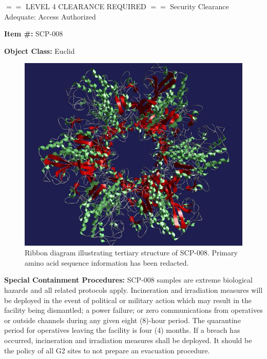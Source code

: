 \begin{center}
$==$ LEVEL 4 CLEARANCE REQUIRED $==$\linebreak
Security Clearance Adequate: Access Authorized
\end{center}

\textbf{Item \#:} SCP-008

\textbf{Object Class:} Euclid

\begin{figure}[h]
\begin{center}
\includegraphics[scale=0.33]{scp/008.jpg}
\linebreak Ribbon diagram illustrating tertiary structure of SCP-008. Primary amino acid sequence information has been redacted.
\end{center}
\end{figure}

\textbf{Special Containment Procedures:} SCP-008 samples are extreme biological hazards and all related protocols apply. Incineration and irradiation measures will be deployed in the event of political or military action which may result in the facility being dismantled; a power failure; or zero communications from operatives or outside channels during any given eight (8)-hour period. The quarantine period for operatives leaving the facility is four (4) months. If a breach has occurred, incineration and irradiation measures shall be deployed. It should be the policy of all G2 sites to not prepare an evacuation procedure.

